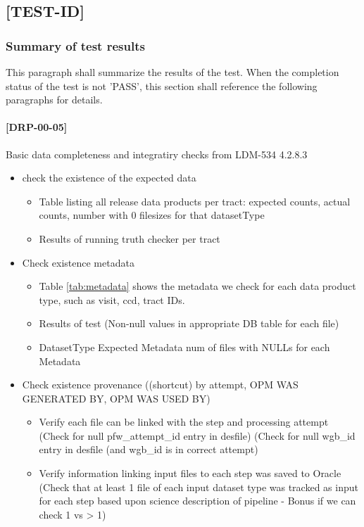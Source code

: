 \documentclass[DM,lsstdraft,STR,toc]{lsstdoc}
\begin{document}
\subsection{[TEST-ID]}
\subsubsection{Summary of test results}
This paragraph shall summarize the results of the test. When the completion status of the test is not 'PASS', this section
shall reference the following paragraphs for details.

\paragraph{[DRP-00-05]}
Basic data completeness and integratiry checks from LDM-534 4.2.8.3
\begin{itemize}
  \item check the existence of the expected data
  \begin{itemize}
    \item Table listing all release data products per tract:  expected counts, actual counts, number with 0 filesizes for that datasetType
    \item Results of running truth checker per tract
  \end{itemize}
  \item Check existence metadata
  \begin{itemize}
    \item Table \ref{tab:metadata} shows the metadata we check for each data product type, such as visit, ccd, tract IDs.

    \item Results of test (Non-null values in appropriate DB table for each file)
    \item DatasetType Expected Metadata num of files with NULLs for each Metadata
  \end{itemize}
  \item Check existence provenance ((shortcut) by attempt, OPM WAS GENERATED BY, OPM WAS USED BY)
  \begin{itemize}
    \item Verify each file can be linked with the step and processing attempt
          (Check for null pfw{\_}attempt{\_}id entry in desfile)
          (Check for null wgb{\_}id entry in desfile (and wgb{\_}id is in correct attempt)
    \item Verify information linking input files to each step was saved to Oracle
          (Check that at least 1 file of each input dataset type was tracked as input for each step based upon science description of pipeline - Bonus if we can check 1 vs > 1)

\end{itemize}
\end{itemize}
\end{document}
